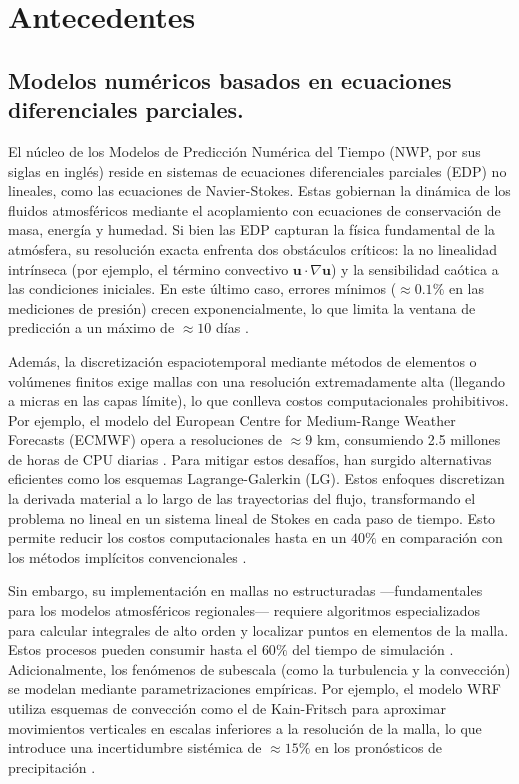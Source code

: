 \chapter{Antecedentes}

\section{Modelos numéricos basados en ecuaciones diferenciales parciales.}

El núcleo de los Modelos de Predicción Numérica del Tiempo (NWP, por sus siglas en inglés) reside en sistemas de ecuaciones diferenciales parciales (EDP) no lineales, como las ecuaciones de Navier-Stokes. Estas gobiernan la dinámica de los fluidos atmosféricos mediante el acoplamiento con ecuaciones de conservación de masa, energía y humedad. Si bien las EDP capturan la física fundamental de la atmósfera, su resolución exacta enfrenta dos obstáculos críticos: la no linealidad intrínseca (por ejemplo, el término convectivo $\mathbf{u} \cdot \nabla \mathbf{u}$) y la sensibilidad caótica a las condiciones iniciales. En este último caso, errores mínimos ($\approx 0.1\%$ en las mediciones de presión) crecen exponencialmente, lo que limita la ventana de predicción a un máximo de $\approx 10$ días \citep{lorenz1963deterministic}.

Además, la discretización espaciotemporal mediante métodos de elementos o volúmenes finitos exige mallas con una resolución extremadamente alta (llegando a micras en las capas límite), lo que conlleva costos computacionales prohibitivos. Por ejemplo, el modelo del European Centre for Medium-Range Weather Forecasts (ECMWF) opera a resoluciones de $\approx 9$ km, consumiendo 2.5 millones de horas de CPU diarias \citep{ecmwf2023}. Para mitigar estos desafíos, han surgido alternativas eficientes como los esquemas Lagrange-Galerkin (LG). Estos enfoques discretizan la derivada material a lo largo de las trayectorias del flujo, transformando el problema no lineal en un sistema lineal de Stokes en cada paso de tiempo. Esto permite reducir los costos computacionales hasta en un $40\%$ en comparación con los métodos implícitos convencionales \citep{bermejo2016lagrange}.

Sin embargo, su implementación en mallas no estructuradas —fundamentales para los modelos atmosféricos regionales— requiere algoritmos especializados para calcular integrales de alto orden y localizar puntos en elementos de la malla. Estos procesos pueden consumir hasta el $60\%$ del tiempo de simulación \citep{bermejo2016lagrange}. Adicionalmente, los fenómenos de subescala (como la turbulencia y la convección) se modelan mediante parametrizaciones empíricas. Por ejemplo, el modelo WRF utiliza esquemas de convección como el de Kain-Fritsch para aproximar movimientos verticales en escalas inferiores a la resolución de la malla, lo que introduce una incertidumbre sistémica de $\approx 15\%$ en los pronósticos de precipitación \citep{skamarock2019wrf}.

